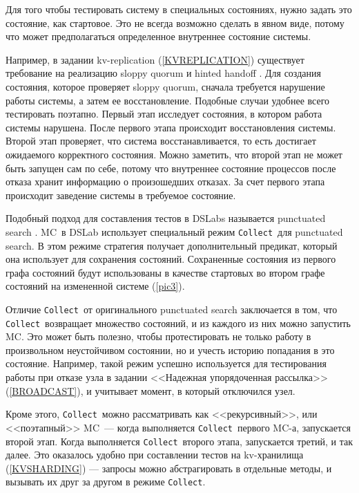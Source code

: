 \documentclass[a4paper,12pt]{extarticle}
\newcommand{\collect}[0]{\texttt{Collect}}
\newcommand{\mc}[0]{MC}
\begin{document}
Для того чтобы тестировать систему в специальных состояниях, нужно задать это состояние, как стартовое.
Это не всегда возможно сделать в явном виде, потому что может предполагаться определенное внутреннее состояние системы.

Например, в задании kv-replication (\cref{KVREPLICATION}) существует требование на реализацию sloppy quorum и hinted handoff \cite{b17}.
Для создания состояния, которое проверяет sloppy quorum, сначала требуется нарушение работы системы, а затем ее восстановление.
Подобные случаи удобнее всего тестировать поэтапно.
Первый этап исследует состояния, в котором работа системы нарушена.
После первого этапа происходит восстановления системы.
Второй этап проверяет, что система восстанавливается, то есть достигает ожидаемого корректного состояния.
Можно заметить, что второй этап не может быть запущен сам по себе, потому что внутреннее состояние процессов после отказа хранит информацию о произошедших отказах.
За счет первого этапа происходит заведение системы в требуемое состояние.

Подобный подход для составления тестов в DSLabs называется punctuated search \cite{b1}.
\mc\ в DSLab использует специальный режим \collect\ для punctuated search.
В этом режиме стратегия получает дополнительный предикат, который она использует для сохранения состояний.
Сохраненные состояния из первого графа состояний будут использованы в качестве стартовых во втором графе состояний на измененной системе (\cref{pic3}).

Отличие \collect\ от оригинального punctuated search заключается в том, что \collect\ возвращает множество состояний, и из каждого из них можно запустить \mc.
Это может быть полезно, чтобы протестировать не только работу в произвольном неустойчивом состоянии, но и учесть историю попадания в это состояние.
Например, такой режим успешно используется для тестирования работы при отказе узла в задании <<Надежная упорядоченная рассылка>> (\cref{BROADCAST}), и учитывает момент, в который отключился узел.

Кроме этого, \collect\ можно рассматривать как <<рекурсивный>>, или <<поэтапный>> \mc\ --- когда выполняется \collect\ первого \mc-а, запускается второй этап.
Когда выполняется \collect\ второго этапа, запускается третий, и так далее.
Это оказалось удобно при составлении тестов на kv-хранилища (\cref{KVSHARDING}) --- запросы можно абстрагировать в отдельные методы, и вызывать их друг за другом в режиме \collect.
\end{document}
